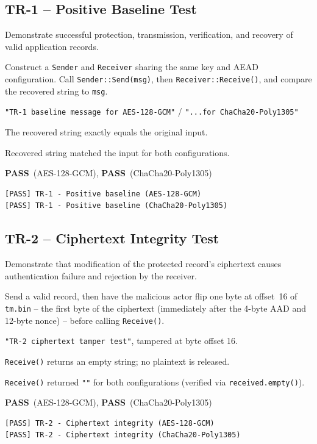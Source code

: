 \documentclass[11pt]{article}
\newcommand{\PASS}{\textcolor{passgreen}{\textbf{PASS}}}
\begin{document}
\subsection{TR-1 -- Positive Baseline Test}

\begin{description}[leftmargin=2.2cm,style=nextline]
\item[Objective] Demonstrate successful protection, transmission, verification, and
recovery of valid application records.
\item[Procedure] Construct a \texttt{Sender} and \texttt{Receiver} sharing the same
key and AEAD configuration. Call \texttt{Sender::Send(msg)}, then
\texttt{Receiver::Receive()}, and compare the recovered string to \texttt{msg}.
\item[Test Input] \texttt{"TR-1 baseline message for AES-128-GCM"} / \texttt{"...for
ChaCha20-Poly1305"}
\item[Expected Behaviour] The recovered string exactly equals the original input.
\item[Observed Behaviour] Recovered string matched the input for both configurations.
\item[Outcome] \PASS\ (AES-128-GCM), \PASS\ (ChaCha20-Poly1305)
\end{description}
\begin{lstlisting}[style=console]
[PASS] TR-1 - Positive baseline (AES-128-GCM)
[PASS] TR-1 - Positive baseline (ChaCha20-Poly1305)
\end{lstlisting}

\subsection{TR-2 -- Ciphertext Integrity Test}

\begin{description}[leftmargin=2.2cm,style=nextline]
\item[Objective] Demonstrate that modification of the protected record's ciphertext
causes authentication failure and rejection by the receiver.
\item[Procedure] Send a valid record, then have the malicious actor flip one byte at
offset~16 of \texttt{tm.bin} -- the first byte of the ciphertext (immediately after the
4-byte AAD and 12-byte nonce) -- before calling \texttt{Receive()}.
\item[Test Input] \texttt{"TR-2 ciphertext tamper test"}, tampered at byte offset 16.
\item[Expected Behaviour] \texttt{Receive()} returns an empty string; no plaintext is
released.
\item[Observed Behaviour] \texttt{Receive()} returned \texttt{""} for both
configurations (verified via \texttt{received.empty()}).
\item[Outcome] \PASS\ (AES-128-GCM), \PASS\ (ChaCha20-Poly1305)
\end{description}
\begin{lstlisting}[style=console]
[PASS] TR-2 - Ciphertext integrity (AES-128-GCM)
[PASS] TR-2 - Ciphertext integrity (ChaCha20-Poly1305)
\end{lstlisting}
\end{document}

